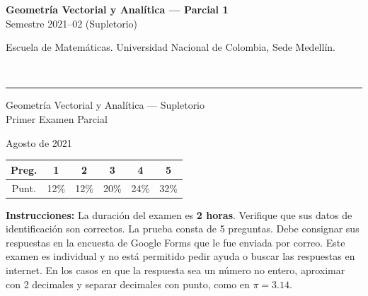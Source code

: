 \documentclass[11pt]{article}
\begin{document}
\noindent
\begin{minipage}[t]{0.6\linewidth}
{\small\bfseries Geometría Vectorial y Analítica --- Parcial 1}\\
{\small Semestre 2021--02 (Supletorio)}
\end{minipage}%
\hfill
\begin{minipage}[t]{0.35\linewidth}
\raggedleft\small Escuela de Matemáticas. Universidad Nacional de Colombia, Sede Medellín.
\end{minipage}\\[2pt]
\rule{\linewidth}{0.6pt}

\vspace{6pt}
\noindent Geometría Vectorial y Analítica --- Supletorio\\
Primer Examen Parcial

\vspace{4pt}
\noindent Agosto de 2021

\vspace{6pt}
\begin{center}
\begin{tabular}{|c|c|c|c|c|c|}
\hline
Preg. & 1 & 2 & 3 & 4 & 5 \\
\hline
Punt. & 12\% & 12\% & 20\% & 24\% & 32\% \\
\hline
\end{tabular}
\end{center}

\vspace{10pt}
\textbf{Instrucciones:} La duración del examen es \textbf{2 horas}. Verifique que sus datos de identificación son correctos. La prueba consta de 5 preguntas. Debe consignar sus respuestas en la encuesta de Google Forms que le fue enviada por correo. Este examen es individual y no está permitido pedir ayuda o buscar las respuestas en internet. En los casos en que la respuesta sea un número no entero, aproximar con 2 decimales y separar decimales con punto, como en $\pi=3.14$.
\end{document}

